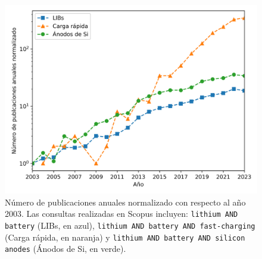 \begin{figure}[h!]
    \centering
    \includegraphics[width=.8\textwidth]{Introduccion/scopus.png}
    \caption{Número de publicaciones anuales normalizado con respecto al año 2003. 
    Las consultas realizadas en Scopus \cite{SCOPUS} incluyen: 
    \texttt{lithium AND battery} (LIBs, en azul), \texttt{lithium AND battery AND 
    fast-charging} (Carga rápida, en naranja) y \texttt{lithium AND battery AND 
    silicon anodes} (Ánodos de Si, en verde).}
    \label{fig:scopus}
\end{figure}
